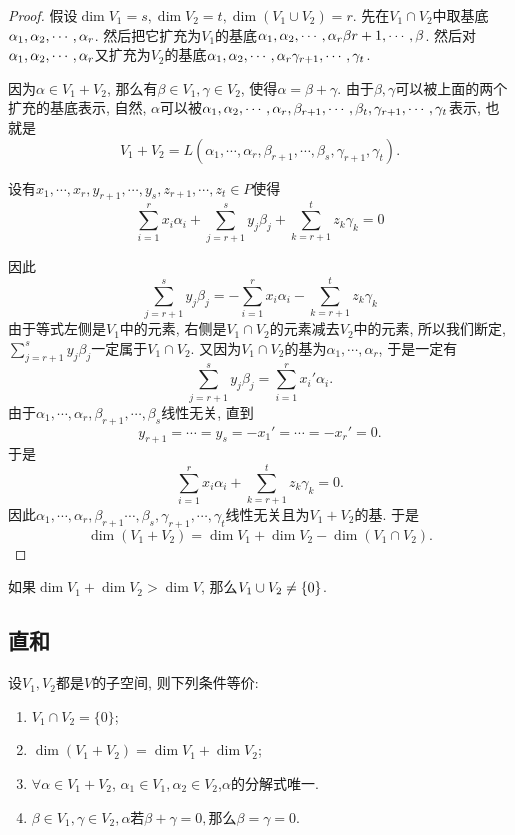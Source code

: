 \documentclass{ctexart}
\begin{document}
\begin{proof}
    假设$\dim V_1=s,\dim V_2=t, \dim (V_1\cup V_2)=r$. 先在$V_1 \cap V_2$中取基底${{\alpha}_1, {\alpha}_2,\cdots, {\alpha}_{r}}$. 然后把它扩充为$V_1$的基底${{\alpha}_1, {\alpha}_2,\cdots, {\alpha}_{r}} \beta{r+1},\cdots, \beta$. 然后对${{\alpha}_1, {\alpha}_2,\cdots, {\alpha}_{r}}$又扩充为$V_2$的基底${{\alpha}_1, {\alpha}_2,\cdots, {\alpha}_{r}} \gamma_{r+1},\cdots, \gamma_t$. 

    因为$\alpha\in V_1+V_2$, 那么有$\beta\in V_1,\gamma\in V_2$, 使得$\alpha=\beta+\gamma$. 由于$\beta,\gamma$可以被上面的两个扩充的基底表示, 自然, $\alpha$可以被${{\alpha}_1, {\alpha}_2,\cdots, {\alpha}_{r}}, \beta_{r+1},\cdots, \beta_{t},\gamma_{r+1},\cdots, \gamma_t$表示, 也就是
    \[
        V_1+V_2=L(\alpha_1,\cdots, \alpha_r, \beta_{r+1},\cdots, \beta_s,\gamma_{r+1},\gamma_t).
    \]

    设有$x_1, \cdots, x_r, y_{r+1}, \cdots, y_s, z_{r+1},\cdots,z_t\in P$使得
    \[
        {\sum_{i=1}^{r}x_i\alpha_i} + \sum_{j=r+1}^{s} y_j\beta_j + \sum_{k=r+1}^{t}z_k\gamma_k=0
    \]
    
    因此
    \[
       \sum_{j=r+1}^{s} y_j\beta_j =- \sum_{i=1}^{r}x_i\alpha_i-  \sum_{k=r+1}^{t}z_k\gamma_k
    \]
    由于等式左侧是$V_1$中的元素, 右侧是$V_1\cap V_2$的元素减去$V_2$中的元素, 所以我们断定,  $\sum_{j=r+1}^{s} y_j\beta_j$一定属于$V_1\cap V_2$. 又因为$V_1\cap V_2$的基为$\alpha_1,\cdots, \alpha_r$, 于是一定有
    \[
        \sum_{j=r+1}^{s}y_j\beta_j=\sum_{i=1}^{r}x_i'\alpha_i.
    \]
    由于$\alpha_1,\cdots, \alpha_r,\beta_{r+1},\cdots, \beta_s$线性无关, 直到
    \[
        y_{r+1}=\cdots=y_s=-x_1'=\cdots=-x_r'=0.
    \]
    于是
    \[
        \sum_{i=1}^{r}x_i\alpha_i+\sum_{k=r+1}^{t}z_k\gamma_k=0.
    \]
    因此$\alpha_1,\cdots,\alpha_r,\beta_{r+1}\cdots,\beta_s,\gamma_{r+1},\cdots,\gamma_t$线性无关且为$V_1+V_2$的基. 于是
    \[
        \dim (V_1+V_2)=\dim V_1+\dim V_2-\dim(V_1\cap V_2).
    \]
\end{proof}

\begin{corollary}
    如果$\dim V_1+\dim V_2>\dim V$, 那么$V_1\cup V_2 \neq \{0\}$.
\end{corollary}

\subsection{直和} 

\begin{theorem}[直和的等价定义]
    设$V_{1},V_{2}$都是$V$的子空间, 则下列条件等价:
    \begin{enumerate}
        \item $V_{1}\cap V_{2}=\{0\}$;
        \item $\dim(V_{1}+V_{2})=\dim V_{1}+\dim V_{2}$;
        \item $\forall\alpha\in V_{1}+V_{2}$, $\alpha_{1}\in V_{1},\alpha_{2}\in V_{2}$,$\alpha$的分解式唯一. 
        \item $\beta\in V_1,\gamma\in V_2,\alpha$若$\beta+\gamma=0,$那么$\beta=\gamma=0$.
    \end{enumerate}
\end{theorem}
\end{document}
